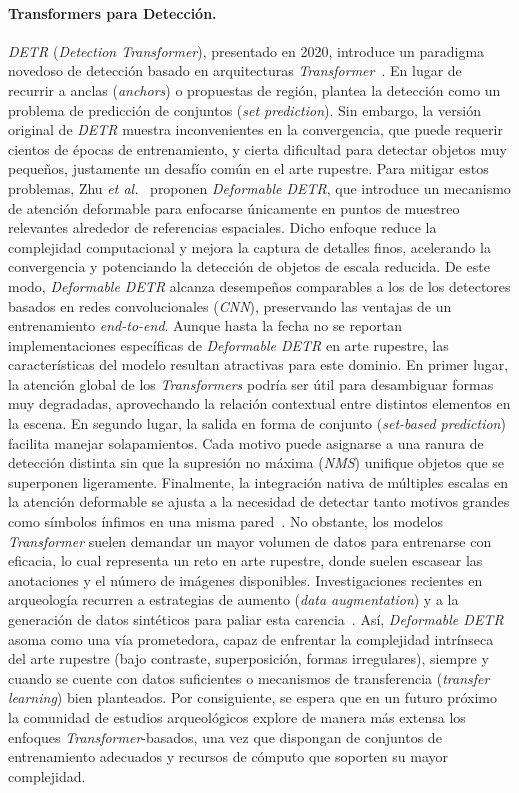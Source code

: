 \paragraph{Transformers para Detección.}
\textit{DETR} (\textit{Detection Transformer}), presentado en 2020, introduce un paradigma novedoso de detección basado en arquitecturas \textit{Transformer}~\cite{carion2020end}.
En lugar de recurrir a anclas (\textit{anchors}) o propuestas de región, plantea la detección como un problema de predicción de conjuntos (\textit{set prediction}).
Sin embargo, la versión original de \textit{DETR} muestra inconvenientes en la convergencia, que puede requerir cientos de épocas de entrenamiento, y cierta dificultad para detectar objetos muy pequeños, justamente un desafío común en el arte rupestre.
Para mitigar estos problemas, Zhu \textit{et al.}~\cite{zhu2021} proponen \textit{Deformable DETR}, que introduce un mecanismo de atención deformable para enfocarse únicamente en puntos de muestreo relevantes alrededor de referencias espaciales.
Dicho enfoque reduce la complejidad computacional y mejora la captura de detalles finos, acelerando la convergencia y potenciando la detección de objetos de escala reducida.
De este modo, \textit{Deformable DETR} alcanza desempeños comparables a los de los detectores basados en redes convolucionales (\textit{CNN}), preservando las ventajas de un entrenamiento \textit{end-to-end}.
Aunque hasta la fecha no se reportan implementaciones específicas de \textit{Deformable DETR} en arte rupestre, las características del modelo resultan atractivas para este dominio.
En primer lugar, la atención global de los \textit{Transformers} podría ser útil para desambiguar formas muy degradadas, aprovechando la relación contextual entre distintos elementos en la escena.
En segundo lugar, la salida en forma de conjunto (\textit{set-based prediction}) facilita manejar solapamientos. Cada motivo puede asignarse a una ranura de detección distinta sin que la supresión no máxima (\textit{NMS}) unifique objetos que se superponen ligeramente.
Finalmente, la integración nativa de múltiples escalas en la atención deformable se ajusta a la necesidad de detectar tanto motivos grandes como símbolos ínfimos en una misma pared~\cite{zhu2021,idjaton2022}.
No obstante, los modelos \textit{Transformer} suelen demandar un mayor volumen de datos para entrenarse con eficacia, lo cual representa un reto en arte rupestre, donde suelen escasear las anotaciones y el número de imágenes disponibles.
Investigaciones recientes en arqueología recurren a estrategias de aumento (\textit{data augmentation}) y a la generación de datos sintéticos para paliar esta carencia~\cite{idjaton2022}.
Así, \textit{Deformable DETR} asoma como una vía prometedora, capaz de enfrentar la complejidad intrínseca del arte rupestre (bajo contraste, superposición, formas irregulares), siempre y cuando se cuente con datos suficientes o mecanismos de transferencia (\textit{transfer learning}) bien planteados.
Por consiguiente, se espera que en un futuro próximo la comunidad de estudios arqueológicos explore de manera más extensa los enfoques \textit{Transformer}-basados, una vez que dispongan de conjuntos de entrenamiento adecuados y recursos de cómputo que soporten su mayor complejidad.

